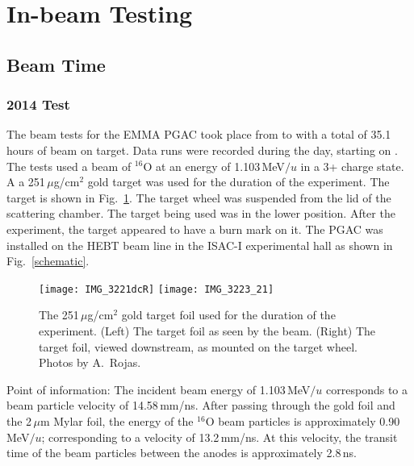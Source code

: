 \section{In-beam Testing}
\subsection{Beam Time}
\subsubsection{2014 Test}
The beam tests for the EMMA PGAC took place from \longusdate{} to \longusdate{} with a total of 35.1\,hours of beam on target.  Data runs were recorded during the day, starting %
 on \longusdate{}. The tests used a beam of $^{16}$O at an energy of 1.103\,MeV$/u$ in a 3+ charge state.  A a 251\,$\mu$g/cm$^2$ gold target was used for the duration of the experiment.  The target is shown in Fig.~\ref{target}.  The target wheel was suspended from the lid of the scattering chamber.  The target being used was in the lower position.  After the experiment, the target appeared to have a burn mark on it.  The PGAC was installed on the HEBT beam line in the ISAC-I experimental hall as shown in Fig.~\ref{schematic}.

\begin{figure}%
\centering
\hspace{\fill}
\texttt{[image: IMG\_3221dcR]}\hspace{\fill}
\texttt{[image: IMG\_3223\_21]}\hspace{\fill}
\caption{The 251\,$\mu$g/cm$^2$ gold target foil used for the duration of the experiment.  (Left) The target foil as seen by the beam.  (Right) The target foil, viewed downstream, as mounted on the target wheel.  Photos by A.\ Rojas.}%
\label{target}%
\end{figure}
Point of information: The incident beam energy of 1.103\,MeV$/u$ corresponds to a beam particle velocity of 14.58\,mm/ns.  After passing through the gold foil and the 2\,$\mu$m Mylar foil, the energy of the $^{16}$O beam particles is approximately 0.90\,MeV$/u$; corresponding to a velocity of 13.2\,mm/ns.  At this velocity, the transit time of the beam particles between the anodes is approximately 2.8\,ns.

